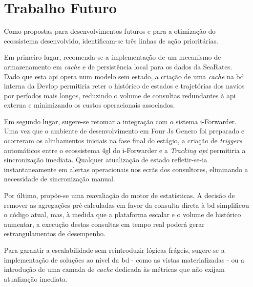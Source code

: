 \section{Trabalho Futuro}

Como propostas para desenvolvimentos futuros e para a otimização do ecossistema desenvolvido, identificam-se três linhas de ação prioritárias.

Em primeiro lugar, recomenda-se a implementação de um mecanismo de armazenamento em \textit{cache} e de persistência local para os dados da SeaRates. Dado que esta \gls{api} opera num modelo sem estado, a criação de uma \textit{cache} na \gls{bd} interna da Devlop permitiria reter o histórico de estados e trajetórias dos navios por períodos mais longos, reduzindo o volume de consultas redundantes à \gls{api} externa e minimizando os custos operacionais associados.

Em segundo lugar, sugere-se retomar a integração com o sistema i-Forwarder. Uma vez que o ambiente de desenvolvimento em Four Js Genero foi preparado e ocorreram os alinhamentos iniciais na fase final do estágio, a criação de \textit{triggers} automáticos entre o ecossistema \gls{4gl} do i-Forwarder e a \textit{Tracking \gls{api}} permitiria a sincronização imediata. Qualquer atualização de estado refletir-se-ia instantaneamente em alertas operacionais nos ecrãs dos consultores, eliminando a necessidade de sincronização manual.

Por último, propõe-se uma reavaliação do motor de estatísticas. A decisão de remover as agregações pré-calculadas em favor da consulta direta à \gls{bd} simplificou o código atual, mas, à medida que a plataforma escalar e o volume de histórico aumentar, a execução destas consultas em tempo real poderá gerar estrangulamentos de desempenho.

Para garantir a escalabilidade sem reintroduzir lógicas frágeis, sugere-se a implementação de soluções ao nível da \gls{bd} - como as vistas materializadas - ou a introdução de uma camada de \textit{cache} dedicada às métricas que não exijam atualização imediata.

